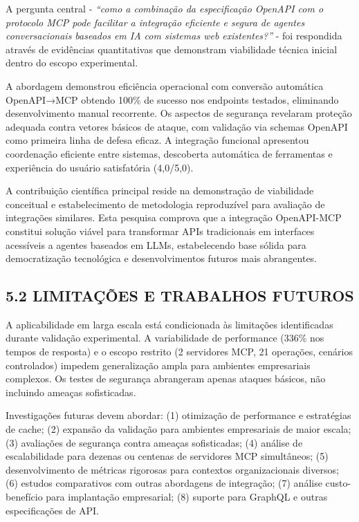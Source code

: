 \documentclass[
]{article}
\begin{document}
A pergunta central - \emph{``como a combinação da especificação OpenAPI
com o protocolo MCP pode facilitar a integração eficiente e segura de
agentes conversacionais baseados em IA com sistemas web existentes?''} -
foi respondida através de evidências quantitativas que demonstram
viabilidade técnica inicial dentro do escopo experimental.

A abordagem demonstrou eficiência operacional com conversão automática
OpenAPI→MCP obtendo 100\% de sucesso nos endpoints testados, eliminando
desenvolvimento manual recorrente. Os aspectos de segurança revelaram
proteção adequada contra vetores básicos de ataque, com validação via
schemas OpenAPI como primeira linha de defesa eficaz. A integração
funcional apresentou coordenação eficiente entre sistemas, descoberta
automática de ferramentas e experiência do usuário satisfatória
(4,0/5,0).

A contribuição científica principal reside na demonstração de
viabilidade conceitual e estabelecimento de metodologia reproduzível
para avaliação de integrações similares. Esta pesquisa comprova que a
integração OpenAPI-MCP constitui solução viável para transformar APIs
tradicionais em interfaces acessíveis a agentes baseados em LLMs,
estabelecendo base sólida para democratização tecnológica e
desenvolvimentos futuros mais abrangentes.

\subsection{5.2 LIMITAÇÕES E TRABALHOS
FUTUROS}\label{limitauxe7uxf5es-e-trabalhos-futuros}

A aplicabilidade em larga escala está condicionada às limitações
identificadas durante validação experimental. A variabilidade de
performance (336\% nos tempos de resposta) e o escopo restrito (2
servidores MCP, 21 operações, cenários controlados) impedem
generalização ampla para ambientes empresariais complexos. Os testes de
segurança abrangeram apenas ataques básicos, não incluindo ameaças
sofisticadas.

Investigações futuras devem abordar: (1) otimização de performance e
estratégias de cache; (2) expansão da validação para ambientes
empresariais de maior escala; (3) avaliações de segurança contra ameaças
sofisticadas; (4) análise de escalabilidade para dezenas ou centenas de
servidores MCP simultâneos; (5) desenvolvimento de métricas rigorosas
para contextos organizacionais diversos; (6) estudos comparativos com
outras abordagens de integração; (7) análise custo-benefício para
implantação empresarial; (8) suporte para GraphQL e outras
especificações de API.
\end{document}
